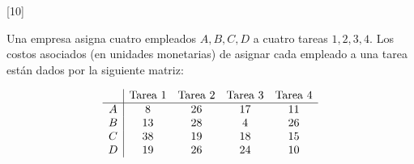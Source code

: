 \documentclass[11pt,paper=a4,answers, addpoints]{exam}
\begin{document}
\begin{questions}
[10]

Una empresa asigna cuatro empleados \(A, B, C, D\) a cuatro tareas \(1, 2, 3, 4\). Los costos asociados (en unidades monetarias) de asignar cada empleado a una tarea están dados por la siguiente matriz:

\[
\begin{array}{c|c c c c}
 & \text{Tarea 1} & \text{Tarea 2} & \text{Tarea 3} & \text{Tarea 4} \\
\hline
A & 8 & 26 & 17 & 11 \\
B & 13 & 28 & 4 & 26 \\
C & 38 & 19 & 18 & 15 \\
D & 19 & 26 & 24 & 10
\end{array}
\]


\end{questions}
\end{document}
